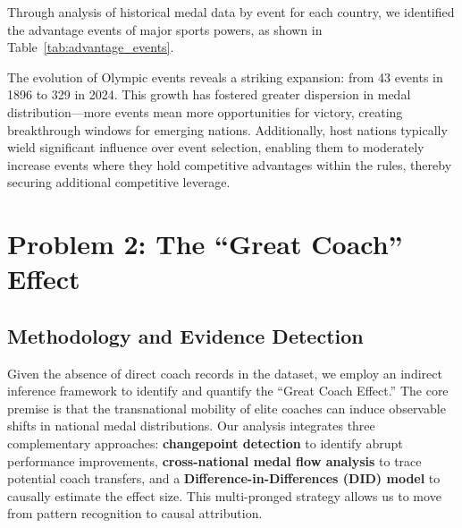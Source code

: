 \documentclass{mcmthesis}
\begin{document}
Through analysis of historical medal data by event for each country, we identified the advantage events of major sports powers, as shown in Table~\ref{tab:advantage_events}.

\begin{table}[htbp]
\centering
\caption{Advantage Events of Major Countries (Historical Medal Total)}
\label{tab:advantage_events}
\end{table}

The evolution of Olympic events reveals a striking expansion: from 43 events in 1896 to 329 in 2024. This growth has fostered greater dispersion in medal distribution—more events mean more opportunities for victory, creating breakthrough windows for emerging nations. Additionally, host nations typically wield significant influence over event selection, enabling them to moderately increase events where they hold competitive advantages within the rules, thereby securing additional competitive leverage.
\section{Problem 2: The ``Great Coach'' Effect}

\subsection{Methodology and Evidence Detection}

Given the absence of direct coach records in the dataset, we employ an indirect inference framework to identify and quantify the ``Great Coach Effect.'' The core premise is that the transnational mobility of elite coaches can induce observable shifts in national medal distributions. Our analysis integrates three complementary approaches: \textbf{changepoint detection} to identify abrupt performance improvements, \textbf{cross-national medal flow analysis} to trace potential coach transfers, and a \textbf{Difference-in-Differences (DID) model} to causally estimate the effect size. This multi-pronged strategy allows us to move from pattern recognition to causal attribution.
\end{document}
